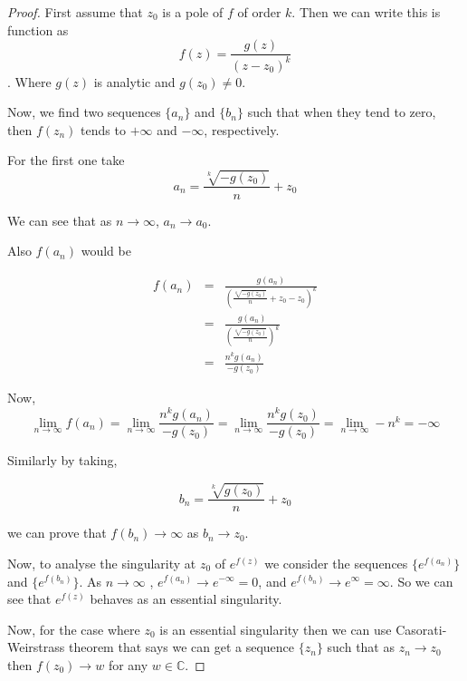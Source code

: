 \documentclass[letterpaper,twoside,11pt]{article}
\begin{document}
\begin{proof}
First assume that $z_0$ is a pole of $f$ of order $k$. Then we can write this is function as \begin{equation}f(z)=\frac{g(z)}{(z-z_0)^k} \nonumber\end{equation}.
Where $g(z)$ is analytic and $g(z_0) \not = 0$.

Now, we find two sequences $\{a_n\}$ and $\{b_n\}$ such that when they tend to zero, then $f(z_n)$ tends to $+ \infty$ and $-\infty$, respectively.

For the first one take
\begin{equation}
a_n=\frac{\sqrt[k]{-g(z_0)}}{n}+z_0 \nonumber
\end{equation} 



We can see that as $n \to \infty$, $a_n \to a_0$.

Also $f(a_n)$ would be

\begin{eqnarray}
f(a_n)&=&\frac{g(a_n)}{(\frac{\sqrt[k]{-g(z_0)}}{n}+z_0-z_0)^k} \nonumber
\\ &=&\frac{g(a_n)}{(\frac{\sqrt[k]{-g(z_0)}}{n})^k} \nonumber
\\ &=&\frac{n^k g(a_n)}{-g(z_0)} \nonumber
\end{eqnarray}

Now,
\begin{equation}
\lim_{n\to \infty}f(a_n)=\lim_{n\to \infty}\frac{n^k g(a_n)}{-g(z_0)}=\lim_{n\to \infty}\frac{n^k g(z_0)}{-g(z_0)}=\lim_{n\to \infty}-n^k = -\infty \nonumber
\end{equation}

Similarly by taking,

\begin{equation}
b_n=\frac{\sqrt[k]{g(z_0)}}{n}+z_0 \nonumber
\end{equation}

we can prove that $f(b_n) \to \infty$ as $b_n \to z_0$.

Now, to analyse the singularity at $z_0$ of $e^{f(z)}$ we consider the sequences $\{e^{f(a_n)}\}$ and $\{e^{f(b_n)}\}$. As $n \to \infty$ , $e^{f(a_n)} \to e^{-\infty}=0$, and $e^{f(b_n)} \to e^{\infty}=\infty$. So we can see that $e^{f(z)}$ behaves as an essential singularity.

Now, for the case where $z_0$ is an essential singularity then we can use Casorati-Weirstrass theorem that says we can get a sequence  $\{z_n\}$ such that as $z_n \to z_0$ then $f(z_0) \to w$ for any $w \in \mathbb{C}$.


\end{proof}
\end{document}
